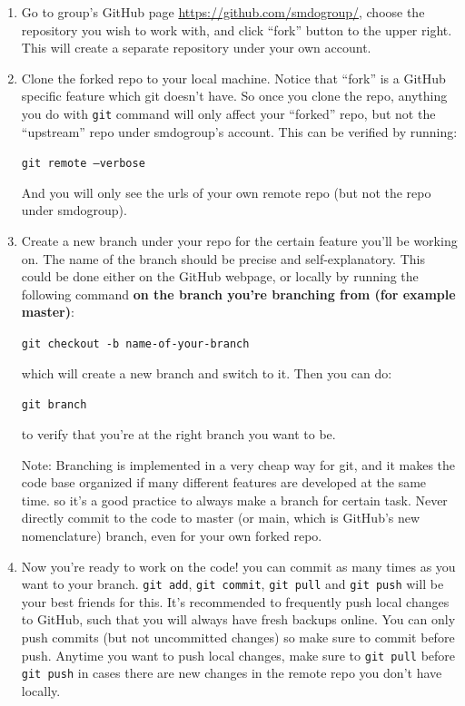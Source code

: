 \documentclass{article}
\begin{document}
\begin{enumerate}
    \item
    Go to group's GitHub page \href{https://github.com/smdogroup/}{https://github.com/smdogroup/},
    choose the repository you wish to work with, and click ``fork'' button to the upper right.
    This will create a separate repository under your own account.

    \item
    Clone the forked repo to your local machine.
    Notice that ``fork'' is a GitHub specific feature which git doesn't have.
    So once you clone the repo, anything you do with \texttt{git} command will only
    affect your ``forked'' repo, but not the ``upstream'' repo under smdogroup's account.
    This can be verified by running:

    \texttt{git remote --verbose}

    And you will only see the urls of your own remote repo (but not the repo under smdogroup).

    \item
    Create a new branch under your repo for the certain feature you'll be working on.
    The name of the branch should be precise and self-explanatory.
    This could be done either on the GitHub webpage, or locally by running the
    following command \textbf{on the branch you're branching from (for example master)}:

    \texttt{git checkout -b name-of-your-branch}

    which will create a new branch and switch to it.
    Then you can do:

    \texttt{git branch}

    to verify that you're at the right branch you want to be.

    Note:
    Branching is implemented in a very cheap way for git, and it makes the code base organized
    if many different features are developed at the same time.
    so it's a good practice to always make a branch for certain task.
    Never directly commit to the code to master (or main, which is GitHub's new nomenclature)
    branch, even for your own forked repo.

    \item
    Now you're ready to work on the code!
    you can commit as many times as you want to your branch.
    \texttt{git add}, \texttt{git commit}, \texttt{git pull} and \texttt{git push} will be your
    best friends for this.
    It's recommended to frequently push local changes to GitHub, such that you will always
    have fresh backups online.
    You can only push commits (but not uncommitted changes) so make sure to commit before push.
    Anytime you want to push local changes, make sure to \texttt{git pull} before \texttt{git push}
    in cases there are new changes in the remote repo you don't have locally.


\end{enumerate}
\end{document}
